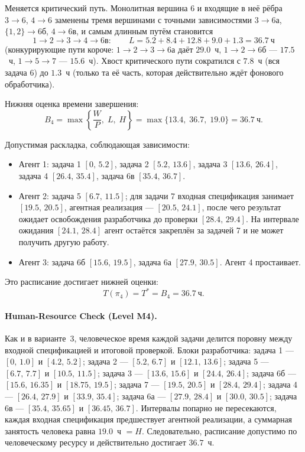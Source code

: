 \documentclass[12pt,a4paper]{article}
\theoremstyle{definition}
\begin{document}
Меняется критический путь. Монолитная вершина 6 и входящие в неё рёбра $3 \to 6$, $4 \to 6$ заменены тремя вершинами с точными зависимостями $3 \to 6\text{а}$, $\{1,2\} \to 6\text{б}$, $4 \to 6\text{в}$, и самым длинным путём становится
\[
  1 \to 2 \to 3 \to 4 \to 6\text{в}: \qquad
  L = 5.2 + 8.4 + 12.8 + 9.0 + 1.3 = 36.7~\text{ч}
\]
(конкурирующие пути короче: $1 \to 2 \to 3 \to 6\text{а}$ даёт $29.0$~ч, $1 \to 2 \to 6\text{б}$ --- $17.5$~ч, $1 \to 5 \to 7$ --- $15.6$~ч). Хвост критического пути сократился с $7.8$~ч (вся задача 6) до $1.3$~ч (только та её часть, которая действительно ждёт фонового обработчика).

Нижняя оценка времени завершения:
\[
  B_4 = \max\left\{\frac{W}{P},\; L,\; H\right\} = \max\{13.4,\; 36.7,\; 19.0\} = 36.7~\text{ч}.
\]

Допустимая раскладка, соблюдающая зависимости:
\begin{itemize}
  \item Агент 1: задача 1 $[0,\,5.2]$, задача 2 $[5.2,\,13.6]$, задача 3 $[13.6,\,26.4]$, задача 4 $[26.4,\,35.4]$, задача 6в $[35.4,\,36.7]$.
  \item Агент 2: задача 5 $[6.7,\,11.5]$; для задачи 7 входная спецификация занимает $[19.5,\,20.5]$, агентная реализация --- $[20.5,\,24.1]$, после чего результат ожидает освобождения разработчика до проверки $[28.4,\,29.4]$. На интервале ожидания $[24.1,\,28.4]$ агент остаётся закреплён за задачей 7 и не может получить другую работу.
  \item Агент 3: задача 6б $[15.6,\,19.5]$, задача 6а $[27.9,\,30.5]$. Агент 4 простаивает.
\end{itemize}

Это расписание достигает нижней оценки:
\[
  T(\pi_4)=T^{*}=B_4=36.7~\text{ч}.
\]

\paragraph{Human-Resource Check (Level M4).}
Как и в варианте~3, человеческое время каждой задачи делится поровну между входной спецификацией и итоговой проверкой. Блоки разработчика: задача 1 --- $[0,\,1.0]$ и $[4.2,\,5.2]$; задача 2 --- $[5.2,\,6.7]$ и $[12.1,\,13.6]$; задача 5 --- $[6.7,\,7.7]$ и $[10.5,\,11.5]$; задача 3 --- $[13.6,\,15.6]$ и $[24.4,\,26.4]$; задача 6б --- $[15.6,\,16.35]$ и $[18.75,\,19.5]$; задача 7 --- $[19.5,\,20.5]$ и $[28.4,\,29.4]$; задача 4 --- $[26.4,\,27.9]$ и $[33.9,\,35.4]$; задача 6а --- $[27.9,\,28.4]$ и $[30.0,\,30.5]$; задача 6в --- $[35.4,\,35.65]$ и $[36.45,\,36.7]$. Интервалы попарно не пересекаются, каждая входная спецификация предшествует агентной реализации, а суммарная занятость человека равна $19.0$~ч $= H$. Следовательно, расписание допустимо по человеческому ресурсу и действительно достигает $36.7$~ч.
\end{document}
